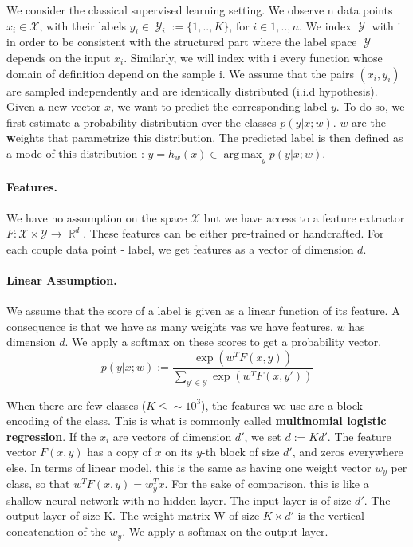 \documentclass{article}
\DeclareMathOperator{\R}{\mathbb{R}}
\DeclareMathOperator{\1}{\mathbb{1}}
\DeclareMathOperator{\Y}{\mathcal{Y}}
\DeclareMathOperator*{\argmax}{arg\,max}
\begin{document}
We consider the classical supervised learning setting.
We observe n data points $x_i \in \mathcal{X}$, with their labels $y_i\in \Y_i:= \{1,..,K\}$, for $i \in {1,..,n}$.
We index $\Y$ with i in order to be consistent with the structured part where the label space $\Y$ depends on the input $x_i$.
Similarly, we will index with i every function  whose domain of definition depend on the sample i.
We assume that the pairs $(x_i, y_i)$ are sampled independently and are identically distributed (i.i.d hypothesis).
Given a new vector $x$, we want to predict the corresponding label $y$. 
To do so, we first estimate a probability distribution over the classes $p(y|x ; w)$.
$w$ are the \textbf{w}eights that parametrize this distribution. 
The predicted label is then defined as a mode of this distribution : $\hat y = h_w(x) \in \argmax_y p(y| x ; w)$.

\paragraph{Features.}
We have no assumption on the space $\mathcal X$ but we have access to a feature extractor $F:\mathcal X \times \mathcal Y \rightarrow \R^d$.
These features can be either pre-trained or handcrafted.
For each couple data point - label, we get features as a vector of dimension $d$.

\paragraph{Linear Assumption.}
We assume that the score of a label is given as a linear function of its feature.
A consequence is that we have as many weights vas we have  features.
$w$ has dimension $d$.
We apply a softmax on these scores to get a probability vector. 
\begin{equation}
	\label{primal probability}
	p(y | x ; w) := \frac{\exp(w^TF(x, y))}{\sum_{y' \in \mathcal{Y}} \exp(w^TF(x, y'))}
\end{equation}

When there are few classes ($K \leq \sim 10^3$), the features we use are a block encoding of the class.
This is what is commonly called \textbf{multinomial logistic regression}.
If the $x_i$ are vectors of dimension $d'$, we set $d:=Kd'$. The feature vector $F(x, y)$ has a copy of $x$ on its $y$-th block of size $d'$, and zeros everywhere else.
In terms of linear model, this is the same as having one weight vector $w_y$ per class, so that $w^TF(x, y) = w_y^Tx$.
For the sake of comparison, this is like a shallow neural network with no hidden layer.
The input layer is of size $d'$.
The output layer of size K.
The weight matrix W of size $K \times d'$ is the vertical concatenation of the $w_y$.
We apply a softmax on the output layer.
\end{document}
